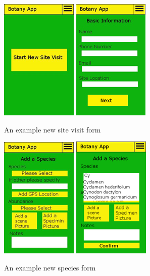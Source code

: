         \begin{figure}
            \centering
            \includegraphics[scale=1]{uiDesign/botanyAppNewSiteVisit1.png}
            \includegraphics[scale=1]{uiDesign/botanyAppNewSiteVisit2.png}
            \caption{An example new site visit form}
            \label{fig:newSiteVisit}
        \end{figure}

        \begin{figure}
            \centering
            \includegraphics[scale=1]{uiDesign/botanyAppAddSpecies1.png}
            \includegraphics[scale=1]{uiDesign/botanyAppAddSpecies2.png}
            \caption{An example new species form}
            \label{fig:newSpecies}
        \end{figure}

